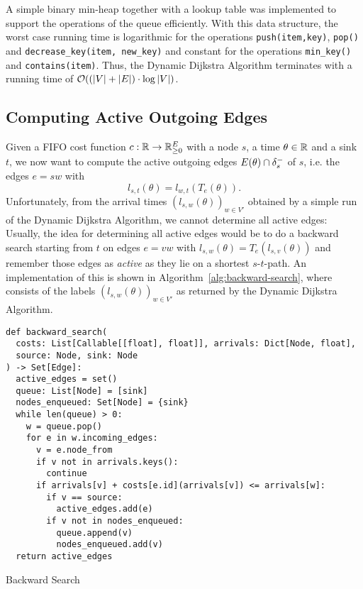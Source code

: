 A simple binary min-heap together with a lookup table was implemented to support the operations of the queue efficiently.
With this data structure, the worst case running time is logarithmic for the operations \texttt{push(item,key)}, \texttt{pop()} and \texttt{decrease\_key(item, new\_key)} and constant for the operations \texttt{min\_key()} and \texttt{contains(item)}.
Thus, the Dynamic Dijkstra Algorithm terminates with a running time of $\mathcal{O}( (\left| V \right| + \left| E \right|) \cdot \log \left| V \right|)$.


\subsection{Computing Active Outgoing Edges}\label{sec:compute-active-edges}

Given a FIFO cost function $c: \mathbb{R}\rightarrow\mathbb{R}_{\geq0}^E$ with a node $s$, a time $\theta\in\mathbb{R}$ and a sink $t$, we now want to compute the active outgoing edges $E(\theta) \cap \delta^-_{s}$ of $s$, i.e. the edges $e=sw$ with 
\[
    l_{s,t}(\theta) = l_{w,t}(T_e(\theta)).
\]
Unfortunately, from the arrival times $(l_{s,w}(\theta))_{w\in V'}$ obtained by a simple run of the Dynamic Dijkstra Algorithm, we cannot determine all active edges:
Usually, the idea for determining all active edges would be to do a backward search starting from $t$ on edges $e=vw$ with $l_{s,w}(\theta) = T_e(l_{s,v}(\theta))$ and remember those edges as \emph{active} as they lie on a shortest $s$-$t$-path.
An implementation of this is shown in Algorithm~\ref{alg:backward-search}, where  consists of the labels $(l_{s,w}(\theta))_{w\in V'}$ as returned by the Dynamic Dijkstra Algorithm.

\begin{algorithm}
    \begin{verbatim}
def backward_search(
  costs: List[Callable[[float], float]], arrivals: Dict[Node, float],
  source: Node, sink: Node
) -> Set[Edge]:
  active_edges = set()
  queue: List[Node] = [sink]
  nodes_enqueued: Set[Node] = {sink}
  while len(queue) > 0:
    w = queue.pop()
    for e in w.incoming_edges:
      v = e.node_from
      if v not in arrivals.keys():
        continue
      if arrivals[v] + costs[e.id](arrivals[v]) <= arrivals[w]:
        if v == source:
          active_edges.add(e)
        if v not in nodes_enqueued:
          queue.append(v)
          nodes_enqueued.add(v)
  return active_edges
    \end{verbatim}
    \caption{Backward Search}
    \label{alg:backward-search}
\end{algorithm}

